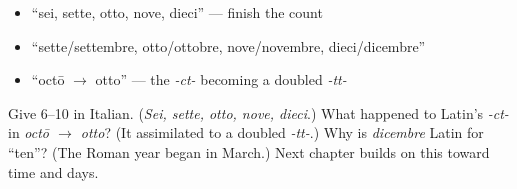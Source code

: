 \begin{itemize}
\raggedright
  \item \textquotedblleft{}sei, sette, otto, nove, dieci\textquotedblright{} — finish the count
  \item \textquotedblleft{}sette/settembre, otto/ottobre, nove/novembre, dieci/dicembre\textquotedblright{}
  \item \textquotedblleft{}octō $\to$ otto\textquotedblright{} — the \emph{-ct-} becoming a doubled \emph{-tt-}
\end{itemize}

\begin{tcolorbox}[breakable,colback=teal!4,colframe=teal!35!black,title={Before you move on}]
Give 6–10 in Italian. (\emph{Sei, sette, otto, nove, dieci}.) What happened to Latin's \emph{-ct-} in \emph{octō $\to$ otto}? (It assimilated to a doubled \emph{-tt-}.) Why is \emph{dicembre} Latin for \textquotedblleft{}ten\textquotedblright{}? (The Roman year began in March.) Next chapter builds on this toward time and days.
\end{tcolorbox}
